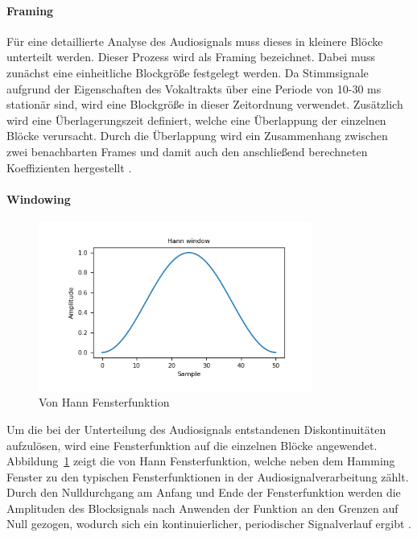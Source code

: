 \paragraph{Framing}\label{sec:Framing}
Für eine detaillierte Analyse des Audiosignals muss dieses in kleinere Blöcke unterteilt werden.
Dieser Prozess wird als Framing bezeichnet.
Dabei muss zunächst eine einheitliche Blockgröße festgelegt werden.
Da Stimmsignale aufgrund der Eigenschaften des Vokaltrakts über eine Periode von 10-30 ms stationär sind, wird eine Blockgröße in dieser Zeitordnung verwendet.
Zusätzlich wird eine Überlagerungszeit definiert, welche eine Überlappung der einzelnen Blöcke verursacht.
Durch die Überlappung wird ein Zusammenhang zwischen zwei benachbarten Frames und damit auch den anschließend berechneten Koeffizienten hergestellt \autocite[vgl.][S. 457]{richter_signal_2022}.

\paragraph{Windowing}
\begin{figure}
  \centering
  \includegraphics[width=0.8\textwidth, keepaspectratio]{images/hann_window.png}
  \caption{Von Hann Fensterfunktion \autocite[][]{noauthor_numpyhanning_2022}}
  \label{fig:vonHannFenster}
\end{figure}
Um die bei der Unterteilung des Audiosignals entstandenen Diskontinuitäten aufzulösen, wird eine Fensterfunktion auf die einzelnen Blöcke angewendet.
Abbildung~\ref{fig:vonHannFenster} zeigt die von Hann Fensterfunktion, welche neben dem Hamming Fenster zu den typischen Fensterfunktionen in der Audiosignalverarbeitung zählt.
Durch den Nulldurchgang am Anfang und Ende der Fensterfunktion werden die Amplituden des Blocksignals nach Anwenden der Funktion an den Grenzen auf Null gezogen, wodurch sich ein kontinuierlicher, periodischer Signalverlauf ergibt \autocite[vgl.][S. 462]{richter_signal_2022}.

